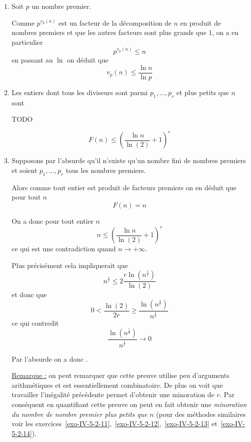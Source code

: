 \begin{sol}
\begin{enumerate}
\item Soit $p$ un nombre premier.

Comme $p^{v_p(n)}$ est un facteur de la décomposition de $n$ en produit de nombres premiers et que les autres facteurs sont plus grands que $1$, on a en particulier
$$p^{v_p(n)} \le n$$
en passant au $\ln$ on déduit que
$$\boxed{v_p(n) \le \frac{\ln n}{\ln p}}$$

\item Les entiers dont tous les diviseurs sont parmi $p_1,\ldots,p_r$ et plus petits que $n$ sont

TODO

$$\boxed{F(n) \le \left(\frac{\ln n}{\ln(2)}+1 \right)^r}$$
\item Supposons par l'absurde qu'il n'existe qu'un nombre fini de nombres premiers et soient $p_1,\ldots,p_r$ tous les nombres premiers.

Alors comme tout entier est produit de facteurs premiers on en déduit que pour tout $n$
$$F(n) = n$$

On a donc pour tout entier $n$
$$n \le \left(\frac{\ln n}{\ln(2)}+1 \right)^r$$
ce qui est une contradiction quand $n \to + \infty$.

Plus précisément cela impliquerait que
$$n^\frac{1}{r} \le 2\frac{r \ln\left(n^\frac{1}{r} \right)}{\ln(2)}$$
et donc que
$$0 <\frac{\ln(2)}{2r} \ge \frac{\ln(n^\frac{1}{r})}{n^\frac{1}{r}}$$
ce qui contredit
$$\frac{\ln(n^\frac{1}{r})}{n^\frac{1}{r}} \to 0$$

Par l'absurde on a donc .

\underline{Remarque :} on peut remarquer que cette preuve utilise peu d'arguments arithmétiques et est essentiellement combinatoire. De plus on voit que travailler l'inégalité précédente permet d'obtenir une minoration de $r$. Par conséquent en quantifiant cette preuve on peut en fait obtenir une \emph{minoration du nombre de nombre premier plus petits que $n$} (pour des méthodes similaires voir les exercices~\ref{exo-IV-5-2-11},~\ref{exo-IV-5-2-12},~\ref{exo-IV-5-2-13} et~\ref{exo-IV-5-2-14}).
\end{enumerate}
\end{sol}


